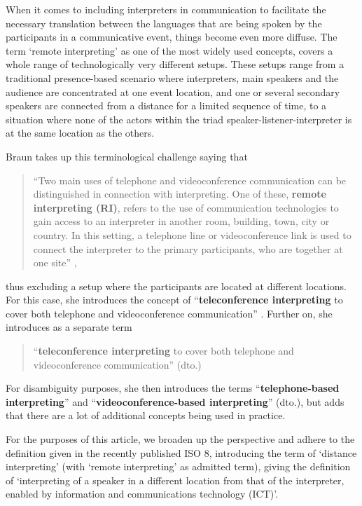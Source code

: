 \documentclass[output=paper]{langsci/langscibook}
\begin{document}
When it comes to including interpreters in communication to facilitate the necessary translation between the languages that are being spoken by the participants in a communicative event, things become even more diffuse. The term ‘remote interpreting’ as one of the most widely used concepts, covers a whole range of technologically very different setups. These setups range from a traditional presence-based scenario where interpreters, main speakers and the audience are concentrated at one event location, and one or several secondary speakers are connected from a distance for a limited sequence of time, to a situation where none of the actors within the triad speaker-listener-interpreter is at the same location as the others. 

Braun takes up this terminological challenge saying that 

\begin{quote}
	“Two main uses of telephone and videoconference communication can be distinguished in connection with interpreting. One of these, \textbf{remote interpreting (RI)}, refers to the use of communication technologies to gain access to an interpreter in another room, building, town, city or country. In this setting, a telephone line or videoconference link is used to connect the interpreter to the primary participants, who are together at one site” \citep[1]{Braun2015},
\end{quote}

thus excluding a setup where the participants are located at different locations. For this case, she introduces the concept of “\textbf{teleconference interpreting} to cover both telephone and videoconference communication” \citep[2]{Braun2015}. Further on, she introduces as a separate term

\begin{quote}
	“\textbf{teleconference interpreting} to cover both telephone and videoconference communication” (dto.)
\end{quote}

For disambiguity purposes, she then introduces the terms “\textbf{telephone-based interpreting}” and “\textbf{videoconference-based interpreting}” (dto.), but adds that there are a lot of additional concepts being used in practice.

For the purposes of this article, we broaden up the perspective and adhere to the definition given in the recently published ISO \citealt{Standard2010}8, introducing the term of ‘distance interpreting’ (with ‘remote interpreting’ as admitted term), giving the definition of ‘interpreting of a speaker in a different location from that of the interpreter, enabled by information and communications technology (ICT)’. 
\end{document}
